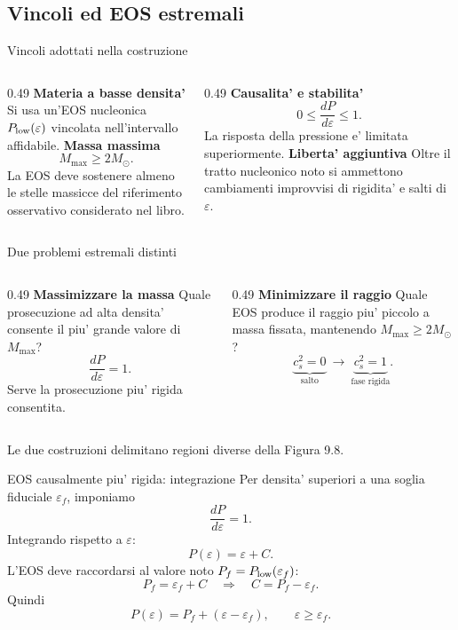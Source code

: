 \subsection{Vincoli ed EOS estremali}
\begin{frame}{Vincoli adottati nella costruzione}
\small
\begin{columns}[T,onlytextwidth]
\begin{column}{0.49\textwidth}
\textbf{Materia a basse densita'}
\medskip
Si usa un'EOS nucleonica $P_{\rm low}(\varepsilon)$ vincolata nell'intervallo affidabile.
\medskip
\textbf{Massa massima}
\[
M_{\max}\geq2M_\odot.
\]
La EOS deve sostenere almeno le stelle massicce del riferimento osservativo considerato nel libro.
\end{column}
\begin{column}{0.49\textwidth}
\textbf{Causalita' e stabilita'}
\[
0\leq\frac{dP}{d\varepsilon}\leq1.
\]
La risposta della pressione e' limitata superiormente.
\medskip
\textbf{Liberta' aggiuntiva}
\medskip
Oltre il tratto nucleonico noto si ammettono cambiamenti improvvisi di rigidita' e salti di $\varepsilon$.
\end{column}
\end{columns}
\end{frame}

\begin{frame}{Due problemi estremali distinti}
\small
\begin{columns}[T,onlytextwidth]
\begin{column}{0.49\textwidth}
\textbf{Massimizzare la massa}
\medskip
Quale prosecuzione ad alta densita' consente il piu' grande valore di $M_{\max}$?
\[
\frac{dP}{d\varepsilon}=1.
\]
Serve la prosecuzione piu' rigida consentita.
\end{column}
\begin{column}{0.49\textwidth}
\textbf{Minimizzare il raggio}
\medskip
Quale EOS produce il raggio piu' piccolo a massa fissata, mantenendo $M_{\max}\geq2M_\odot$?
\[
\underbrace{c_s^2=0}_{\text{salto}}
\ \longrightarrow\
\underbrace{c_s^2=1}_{\text{fase rigida}}.
\]
\end{column}
\end{columns}
\medskip
Le due costruzioni delimitano regioni diverse della Figura 9.8.
\end{frame}

\begin{frame}{EOS causalmente piu' rigida: integrazione}
\small
Per densita' superiori a una soglia fiduciale $\varepsilon_f$, imponiamo
\[
\frac{dP}{d\varepsilon}=1.
\]
Integrando rispetto a $\varepsilon$:
\[
P(\varepsilon)=\varepsilon+C.
\]
L'EOS deve raccordarsi al valore noto $P_f=P_{\rm low}(\varepsilon_f)$:
\[
P_f=\varepsilon_f+C
\quad\Longrightarrow\quad C=P_f-\varepsilon_f.
\]
Quindi
\[
P(\varepsilon)=P_f+(\varepsilon-\varepsilon_f),
\qquad\varepsilon\geq\varepsilon_f.
\]
\end{frame}

